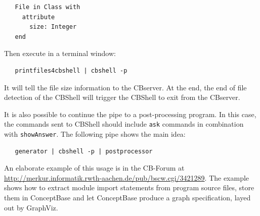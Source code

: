 \begin{verbatim}
   File in Class with
     attribute
       size: Integer
   end
\end{verbatim}


Then execute in a terminal window:

\begin{verbatim}
   printfiles4cbshell | cbshell -p
\end{verbatim}

It will tell the file size information to the CBserver. At the end, the end of file
detection of the CBShell will trigger the CBShell to exit from the CBserver.

It is also possible to continue the pipe to a post-processing program. In this case,
the commands sent to CBShell should include {\tt ask} commands in combination
with {\tt showAnswer}. The following pipe shows the main idea:

\begin{verbatim}
   generator | cbshell -p | postprocessor
\end{verbatim}

An elaborate example of this usage is in the CB-Forum at
\url{http://merkur.informatik.rwth-aachen.de/pub/bscw.cgi/3421289}.
The example shows how to extract module import statements from program
source files, store them in ConceptBase and let ConceptBase produce
a graph specification, layed out by GraphViz.



